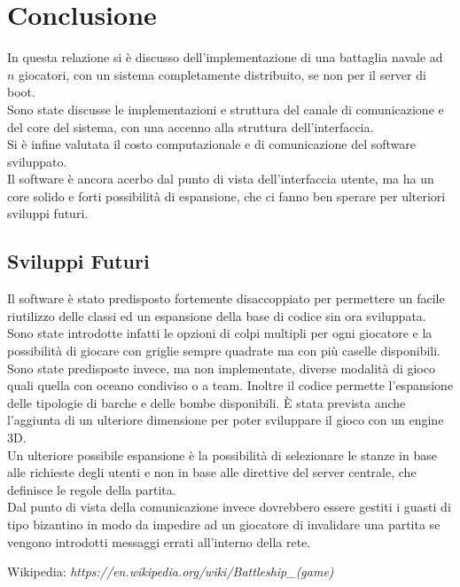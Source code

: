 \documentclass{llncs}
\begin{document}
\section{Conclusione}
In questa relazione si è discusso dell'implementazione di una battaglia navale ad $n$ giocatori, con un sistema completamente distribuito, se non per il server di boot.\\
Sono state discusse le implementazioni e struttura del canale di comunicazione e del core del sistema, con una accenno alla struttura dell'interfaccia.\\
Si è infine valutata il costo computazionale e di comunicazione del software sviluppato.\\
Il software è ancora acerbo dal punto di vista dell'interfaccia utente, ma ha un core solido e forti possibilità di espansione, che ci fanno ben sperare per ulteriori sviluppi futuri.
\subsection{Sviluppi Futuri}
Il software è stato predisposto fortemente disaccoppiato per permettere un facile riutilizzo delle classi ed un espansione della base di codice sin ora sviluppata.\\
Sono state introdotte infatti le opzioni di colpi multipli per ogni giocatore e la possibilità di giocare con griglie sempre quadrate ma con più caselle disponibili.\\
Sono state predisposte invece, ma non implementate, diverse modalità di gioco quali quella con oceano condiviso o a team. Inoltre il codice permette l'espansione delle tipologie di barche e delle bombe disponibili. È stata prevista anche l'aggiunta di un ulteriore dimensione per poter sviluppare il gioco con un engine 3D.\\
Un ulteriore possibile espansione è la possibilità di selezionare le stanze in base alle richieste degli utenti e non in base alle direttive del server centrale, che definisce le regole della partita.\\
Dal punto di vista della comunicazione invece dovrebbero essere gestiti i guasti di tipo bizantino in modo da impedire ad un giocatore di invalidare una partita se vengono introdotti messaggi errati all'interno della rete.
%
%
\begin{thebibliography}{3}
%
Wikipedia: 
\emph{https://en.wikipedia.org/wiki/Battleship\_(game)}


\end{thebibliography}

%
\end{document}
